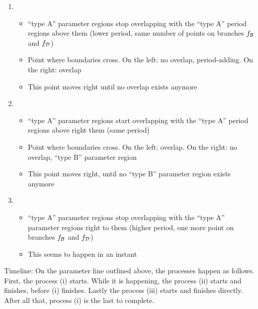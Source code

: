 \begin{enumerate}
    \item \begin{itemize}
              \item ``type A'' parameter regions stop overlapping with the ``type A'' period regions above them (lower period, same number of points on branches $f_{\mathcal{B}}$ and $f_{\mathcal{D}}$)
              \item Point where boundaries cross. On the left: no overlap, period-adding. On the right: overlap
              \item This point moves right until no overlap exists anymore
          \end{itemize}
    \item \begin{itemize}
              \item ``type A'' parameter regions start overlapping with the ``type A'' period regions above right them (same period)
              \item Point where boundaries cross. On the left: overlap. On the right: no overlap, ``type B'' parameter region
              \item This point moves right, until no ``type B'' parameter region exists anymore
          \end{itemize}
    \item \begin{itemize}
              \item ``type A'' parameter regions stop overlapping with the ``type A'' parameter regions right to them (higher period, one more point on branches $f_{\mathcal{B}}$ and $f_{\mathcal{D}}$)
              \item This seems to happen in an instant
          \end{itemize}
\end{enumerate}

Timeline:
On the parameter line outlined above, the processes happen as follows.
First, the process (i) starts.
While it is happening, the process (ii) starts and finishes, before (i) finishes.
Lastly the process (iii) starts and finishes directly.
After all that, process (i) is the last to complete.


